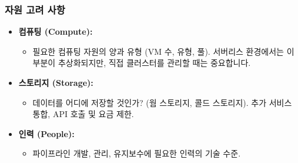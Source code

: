 \documentclass[11pt,a4paper]{article}
\theoremstyle{definition}
\begin{document}
\subsubsection{자원 고려 사항}
\begin{itemize}
    \item \textbf{컴퓨팅 (Compute):}
    \begin{itemize}
        \item 필요한 컴퓨팅 자원의 양과 유형 (VM 수, 유형, 풀). 서버리스 환경에서는 이 부분이 추상화되지만, 직접 클러스터를 관리할 때는 중요합니다.
    \end{itemize}
    \item \textbf{스토리지 (Storage):}
    \begin{itemize}
        \item 데이터를 어디에 저장할 것인가? (웜 스토리지, 콜드 스토리지). 추가 서비스 통합, API 호출 및 요금 제한.
    \end{itemize}
    \item \textbf{인력 (People):}
    \begin{itemize}
        \item 파이프라인 개발, 관리, 유지보수에 필요한 인력의 기술 수준.
    \end{itemize}
\end{itemize}
\end{document}
